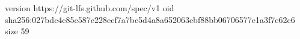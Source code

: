 version https://git-lfs.github.com/spec/v1
oid sha256:027bdc4c85c587c228ecf7a7bc5d4a8a652063ebf88bb06706577e1a3f7e62c6
size 59
